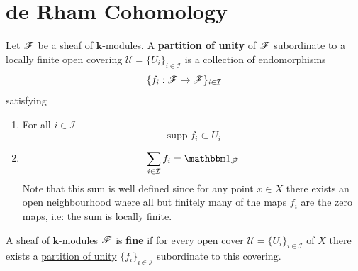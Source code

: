 \documentclass[../../main]{subfiles}
\begin{document}
\chapter{de Rham Cohomology}

\begin{definition}\label{def:partition-of-unity}
  Let \(\mathscr{F}\) be a \hyperref[def:sheaf]{sheaf of \(\mathbf{k}\)-modules}.
  A \textbf{partition of unity} of \(\mathscr{F}\) subordinate to a locally finite open covering \(\mathcal{U} = \{U_{i}\}_{i \in \mathcal{I}}\) is a collection of endomorphisms 
  \begin{equation*}
    \{ f_{i}: \mathscr{F} \to \mathscr{F} \}_{i \in \mathcal{I}}
  \end{equation*}
  satisfying
  \begin{enumerate}
    \item For all \(i \in \mathcal{I}\)
          \begin{equation*}
            \operatorname{supp} f_{i} \subset U_{i}
          \end{equation*}
    \item
          \begin{equation*}
            \sum_{i \in \mathcal{I}} f_{i} = \id_{\sheaf{F}}
          \end{equation*}
        Note that this sum is well defined since for any point \(x \in X\) there exists an open neighbourhood where all but finitely many of the maps \(f_{i}\) are the zero maps, i.e: the sum is locally finite.
  \end{enumerate}
\end{definition}


\begin{definition}\label{def:fine-sheaf}
  A \hyperref[def:sheaf]{sheaf of \(\mathbf{k}\)-modules} \(\mathscr{F}\) is \textbf{fine} if for every open cover \(\mathscr{U} = \{U_{i}\}_{i \in \mathcal{I}}\) of \(X\) there exists a \hyperref[def:partition-of-unity]{partition of unity} \(\{f_{i}\}_{i \in \mathcal{I}}\) subordinate to this covering.
\end{definition}
\end{document}
